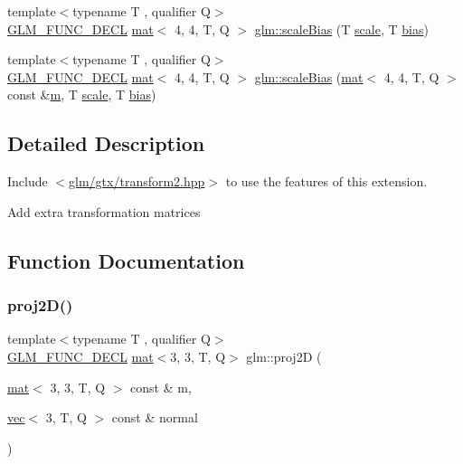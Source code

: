 \begin{DoxyCompactItemize}
\item 
{\footnotesize template$<$typename T , qualifier Q$>$ }\\\mbox{\hyperlink{setup_8hpp_ab2d052de21a70539923e9bcbf6e83a51}{G\+L\+M\+\_\+\+F\+U\+N\+C\+\_\+\+D\+E\+CL}} \mbox{\hyperlink{structglm_1_1mat}{mat}}$<$ 4, 4, T, Q $>$ \mbox{\hyperlink{group__gtx__transform2_gabf249498b236e62c983d90d30d63c99c}{glm\+::scale\+Bias}} (T \mbox{\hyperlink{_s_d_l__opengl__glext_8h_a281421b881aa7a1266842b73a3bc7655}{scale}}, T \mbox{\hyperlink{_s_d_l__opengl__glext_8h_a39c3ffa18f420251c5d132dd8c1c6137}{bias}})
\item 
{\footnotesize template$<$typename T , qualifier Q$>$ }\\\mbox{\hyperlink{setup_8hpp_ab2d052de21a70539923e9bcbf6e83a51}{G\+L\+M\+\_\+\+F\+U\+N\+C\+\_\+\+D\+E\+CL}} \mbox{\hyperlink{structglm_1_1mat}{mat}}$<$ 4, 4, T, Q $>$ \mbox{\hyperlink{group__gtx__transform2_gae2bdd91a76759fecfbaef97e3020aa8e}{glm\+::scale\+Bias}} (\mbox{\hyperlink{structglm_1_1mat}{mat}}$<$ 4, 4, T, Q $>$ const \&\mbox{\hyperlink{_s_d_l__opengl__glext_8h_af593500c283bf1a787a6f947f503a5c2}{m}}, T \mbox{\hyperlink{_s_d_l__opengl__glext_8h_a281421b881aa7a1266842b73a3bc7655}{scale}}, T \mbox{\hyperlink{_s_d_l__opengl__glext_8h_a39c3ffa18f420251c5d132dd8c1c6137}{bias}})
\end{DoxyCompactItemize}


\subsection{Detailed Description}
Include $<$\mbox{\hyperlink{transform2_8hpp}{glm/gtx/transform2.\+hpp}}$>$ to use the features of this extension.

Add extra transformation matrices 

\subsection{Function Documentation}
\mbox{\label{group__gtx__transform2_ga5b992a0cdc8298054edb68e228f0d93e}} 
\subsubsection{\texorpdfstring{proj2\+D()}{proj2D()}}
{\footnotesize\ttfamily template$<$typename T , qualifier Q$>$ \\
\mbox{\hyperlink{setup_8hpp_ab2d052de21a70539923e9bcbf6e83a51}{G\+L\+M\+\_\+\+F\+U\+N\+C\+\_\+\+D\+E\+CL}} \mbox{\hyperlink{structglm_1_1mat}{mat}}$<$3, 3, T, Q$>$ glm\+::proj2D (\begin{DoxyParamCaption}\item[{\mbox{\hyperlink{structglm_1_1mat}{mat}}$<$ 3, 3, T, Q $>$ const \&}]{m,  }\item[{\mbox{\hyperlink{structglm_1_1vec}{vec}}$<$ 3, T, Q $>$ const \&}]{normal }\end{DoxyParamCaption})}

